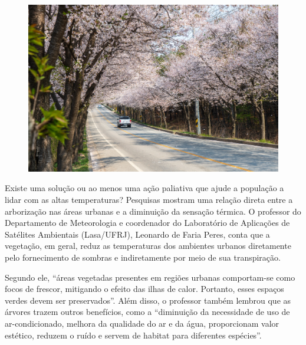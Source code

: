 \begin{myquote}

\begin{figure}[H]
\centering
\includegraphics[scale=0.25]{./imgSAEB_7_POR/media/image47.png}
\end{figure}

Existe uma solução ou ao menos uma ação paliativa que ajude a população a
lidar com as altas temperaturas? Pesquisas mostram uma relação direta entre a
arborização nas áreas urbanas e a diminuição da sensação térmica. O professor
do Departamento de Meteorologia e coordenador do Laboratório de Aplicações de
Satélites Ambientais (Lasa/UFRJ), Leonardo de Faria Peres, conta que a
vegetação, em geral, reduz as temperaturas dos ambientes urbanos diretamente
pelo fornecimento de sombras e indiretamente por meio de sua transpiração.

Segundo ele, ``áreas vegetadas presentes em regiões urbanas comportam-se como
focos de frescor, mitigando o efeito das ilhas de calor. Portanto, esses
espaços verdes devem ser preservados''. Além disso, o professor também lembrou
que as árvores trazem outros benefícios, como a ``diminuição da necessidade de
uso de ar-condicionado, melhora da qualidade do ar e da água, proporcionam
valor estético, reduzem o ruído e servem de habitat para diferentes espécies''.


\end{myquote}

